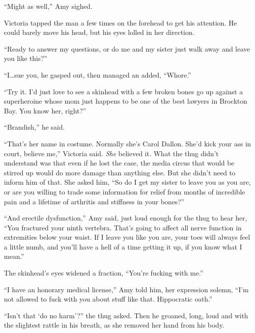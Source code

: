 ``Might as well,'' Amy sighed.



Victoria tapped the man a few times on the forehead to get his attention.  He could barely move his head, but his eyes lolled in her direction.



``Ready to answer my questions, or do me and my sister just walk away and leave you like this?''



``I\ldots sue you, he gasped out, then managed an added, ``Whore.''



``Try it.  I'd just love to see a skinhead with a few broken bones go up against a superheroine whose mom just happens to be one of the best lawyers in Brockton Bay.  You know her, right?''



``Brandish,'' he said.



``That's her name in costume.  Normally she's Carol Dallon.  She'd kick your ass in court, believe me,'' Victoria said.  \emph{She} believed it.  What the thug didn't understand was that even if he lost the case, the media circus that would be stirred up would do more damage than anything else.  But she didn't need to inform him of that.  She asked him, ``So do I get my sister to leave you as you are, or are you willing to trade some information for relief from months of incredible pain and a lifetime of arthritis and stiffness in your bones?''



``And erectile dysfunction,'' Amy said, just loud enough for the thug to hear her, ``You fractured your ninth vertebra.  That's going to affect all nerve function in extremities below your waist.  If I leave you like you are, your toes will always feel a little numb, and you'll have a hell of a time getting it up, if you know what I mean.''



The skinhead's eyes widened a fraction, ``You're fucking with me.''



``I have an honorary medical license,'' Amy told him, her expression solemn, ``I'm not allowed to fuck with you about stuff like that.  Hippocratic oath.''



``Isn't that `do no harm'?'' the thug asked.  Then he groaned, long, loud and with the slightest rattle in his breath, as she removed her hand from his body.



